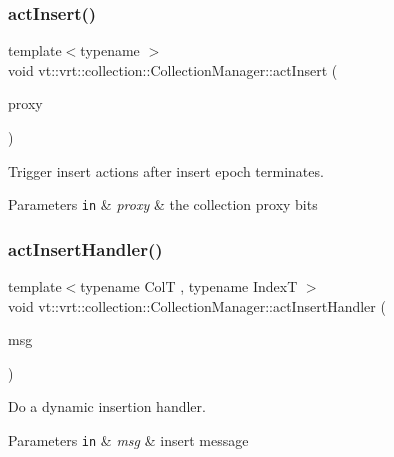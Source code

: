\subsubsection{\texorpdfstring{act\+Insert()}{actInsert()}}
{\footnotesize\ttfamily template$<$typename $>$ \\
void vt\+::vrt\+::collection\+::\+Collection\+Manager\+::act\+Insert (\begin{DoxyParamCaption}\item[{\hyperlink{namespacevt_a1b417dd5d684f045bb58a0ede70045ac}{Virtual\+Proxy\+Type} const \&}]{proxy }\end{DoxyParamCaption})}



Trigger insert actions after insert epoch terminates. 


\begin{DoxyParams}[1]{Parameters}
\mbox{\tt in}  & {\em proxy} & the collection proxy bits \\
\hline
\end{DoxyParams}
\mbox{\label{structvt_1_1vrt_1_1collection_1_1_collection_manager_a0c2b3a0d98264432181392ff178d5782}} 
\subsubsection{\texorpdfstring{act\+Insert\+Handler()}{actInsertHandler()}}
{\footnotesize\ttfamily template$<$typename ColT , typename IndexT $>$ \\
void vt\+::vrt\+::collection\+::\+Collection\+Manager\+::act\+Insert\+Handler (\begin{DoxyParamCaption}\item[{\hyperlink{structvt_1_1vrt_1_1collection_1_1_act_insert_msg}{Act\+Insert\+Msg}$<$ ColT, IndexT $>$ $\ast$}]{msg }\end{DoxyParamCaption})\hspace{0.3cm}{\ttfamily [static]}}



Do a dynamic insertion handler. 


\begin{DoxyParams}[1]{Parameters}
\mbox{\tt in}  & {\em msg} & insert message \\
\hline
\end{DoxyParams}
\mbox{\label{structvt_1_1vrt_1_1collection_1_1_collection_manager_a3ef00b90a3a2d066a7f83b9c32b301d2}} 
